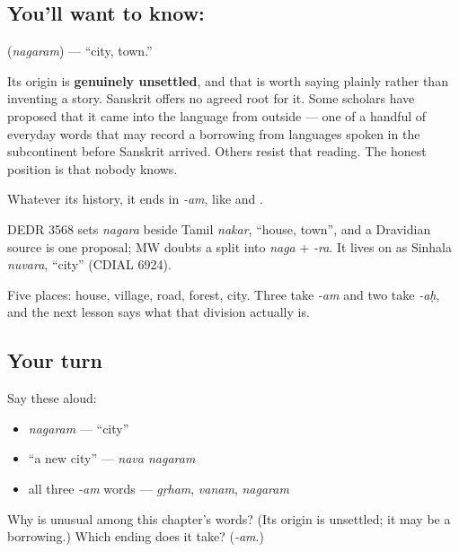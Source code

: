 \subsection*{You'll want to know: }
\textbf{} (\emph{nagaram}) — \textquotedblleft{}city, town.\textquotedblright{}

Its origin is \textbf{genuinely unsettled}, and that is worth saying plainly rather than inventing a story. Sanskrit offers no agreed root for it. Some scholars have proposed that it came into the language from outside — one of a handful of everyday words that may record a borrowing from languages spoken in the subcontinent before Sanskrit arrived. Others resist that reading. The honest position is that nobody knows.

Whatever its history, it ends in \emph{-am}, like \emph{} and \emph{}.

\begin{cousinweb}
DEDR 3568 sets \emph{nagara} beside Tamil \emph{nakar}, \textquotedblleft{}house, town\textquotedblright{}, and a Dravidian source is one proposal; MW doubts a split into \emph{naga} + \emph{-ra}. It lives on as Sinhala \emph{nuvara}, \textquotedblleft{}city\textquotedblright{} (CDIAL 6924).
\end{cousinweb}

\begin{grammarlens}[title={What you've built}]
Five places: house, village, road, forest, city. Three take \emph{-am} and two take \emph{-aḥ}, and the next lesson says what that division actually is.
\end{grammarlens}

\subsection*{Your turn}
Say these aloud:

\begin{itemize}
\raggedright
  \item \emph{nagaram} — \textquotedblleft{}city\textquotedblright{}
  \item \textquotedblleft{}a new city\textquotedblright{} — \emph{nava nagaram}
  \item all three \emph{-am} words — \emph{gṛham}, \emph{vanam}, \emph{nagaram}
\end{itemize}

\begin{tcolorbox}[breakable,colback=teal!4,colframe=teal!35!black,title={Before you move on}]
Why is  unusual among this chapter's words? (Its origin is unsettled; it may be a borrowing.) Which ending does it take? (\emph{-am}.)
\end{tcolorbox}
